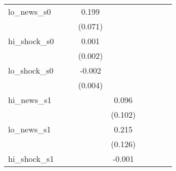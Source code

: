 {\begin{tabular}{l*{8}{c}}
\addlinespace
lo\_news\_s0  &                     &                     &       0.199\sym{***}&                     &                     &                     &                     &                     \\
            &                     &                     &     (0.071)         &                     &                     &                     &                     &                     \\
\addlinespace
hi\_shock\_s0 &                     &                     &       0.001         &                     &                     &                     &                     &                     \\
            &                     &                     &     (0.002)         &                     &                     &                     &                     &                     \\
\addlinespace
lo\_shock\_s0 &                     &                     &      -0.002         &                     &                     &                     &                     &                     \\
            &                     &                     &     (0.004)         &                     &                     &                     &                     &                     \\
\addlinespace
hi\_news\_s1  &                     &                     &                     &       0.096         &                     &                     &                     &                     \\
            &                     &                     &                     &     (0.102)         &                     &                     &                     &                     \\
\addlinespace
lo\_news\_s1  &                     &                     &                     &       0.215         &                     &                     &                     &                     \\
            &                     &                     &                     &     (0.126)         &                     &                     &                     &                     \\
\addlinespace
hi\_shock\_s1 &                     &                     &                     &      -0.001         &                     &                     &                     &                     \\

\end{tabular}}
